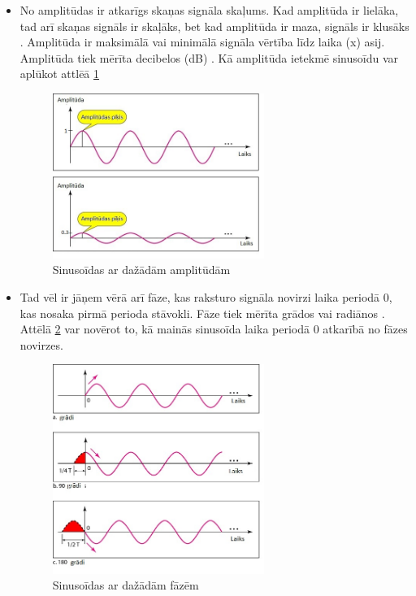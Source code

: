 \documentclass[12pt,paper=A4]{report}
\begin{document}
\begin{itemize}
\item No amplitūdas ir atkarīgs skaņas signāla skaļums. Kad amplitūda ir lielāka, tad arī skaņas signāls ir skaļāks, bet kad amplitūda ir maza, signāls ir klusāks \cite{http://acad.carleton.edu/courses/musc108-00-f14/pages/01/01SixBasicPropertiesofSound.html}. Amplitūda ir maksimālā vai minimālā signāla vērtība līdz laika (x) asij. Amplitūda tiek mērīta decibelos (dB) \cite{http://computerrelatedinfo.blogspot.com/2012/12/what-is-analog-signal-its-properties.html}. Kā amplitūda ietekmē sinusoīdu var aplūkot attlēā \ref{amplitude}

\begin{figure}[H] \centering
\includegraphics[width=0.65\textwidth]{amplitud} 
\caption{Sinusoīdas ar dažādām amplitūdām \cite{properties}}  \label{amplitude} 
\end{figure}

\item Tad vēl ir jāņem vērā arī fāze, kas raksturo signāla novirzi laika periodā 0, kas nosaka pirmā perioda stāvokli. Fāze tiek mērīta grādos vai radiānos \cite{http://ecomputernotes.com/computernetworkingnotes/communication-networks/analog-signal}. Attēlā \ref{phase} var novērot to, kā mainās sinusoīda laika periodā 0 atkarībā no fāzes novirzes. 

\begin{figure}[h] \centering
\includegraphics[width=0.65\textwidth]{phase} 
\caption{Sinusoīdas ar dažādām fāzēm \cite{properties}}  \label{phase} 
\end{figure}
\end{itemize}
\end{document}
